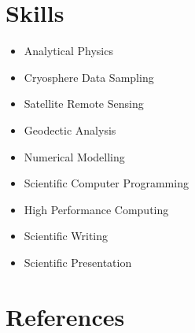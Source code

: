 \documentclass[11pt,a4paper]{article}
\begin{document}
\section*{Skills}
\label{sec:skills}
%
\begin{itemize}
\item Analytical Physics
\item Cryosphere Data Sampling
\item Satellite Remote Sensing
\item Geodectic Analysis
\item Numerical Modelling
\item Scientific Computer Programming
\item High Performance Computing
\item Scientific Writing
\item Scientific Presentation
\end{itemize}
\section*{References}
%

\end{document}
